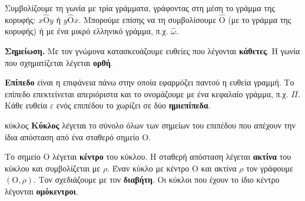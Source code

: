 \begin{center}
\end{center}

Συμβολίζουμε τη γωνία με τρία γράμματα, γράφοντας στη μέση το γράμμα της κορυφής: $x\hat{\mathrm{Ο}}y$ ή $y\hat{\mathrm{Ο}}x$. Μπορούμε επίσης να τη συμβολίσουμε $\hat{\mathrm{Ο}}$ (με το γράμμα της κορυφής) ή με ένα μικρό ελληνικό γράμμα, π.χ. $\hat{\omega}$.

\textbf{Σημείωση.} Με τον γνώμονα κατασκευάζουμε ευθείες που λέγονται \textbf{κάθετες}. Η γωνία που σχηματίζεται λέγεται \textbf{ορθή}.


\textbf{Επίπεδο} είναι η επιφάνεια πάνω στην οποία εφαρμόζει παντού η ευθεία γραμμή. Το επίπεδο επεκτείνεται απεριόριστα και το ονομάζουμε με ένα κεφαλαίο γράμμα, π.χ. $\Pi$. Κάθε ευθεία $\varepsilon$ ενός επιπέδου το χωρίζει σε δύο \textbf{ημιεπίπεδα}.

\begin{center}
\end{center}


\begin{orismos}{κύκλος}
\textbf{Κύκλος} λέγεται το σύνολο όλων των σημείων του επιπέδου που απέχουν την ίδια απόσταση από ένα σταθερό σημείο $\mathrm{Ο}$.
\end{orismos}

Το σημείο $\mathrm{Ο}$ λέγεται \textbf{κέντρο} του κύκλου. Η σταθερή απόσταση λέγεται \textbf{ακτίνα} του κύκλου και συμβολίζεται με $\rho$. Έναν κύκλο με κέντρο $\mathrm{Ο}$ και ακτίνα $\rho$ τον γράφουμε $(\mathrm{Ο},\rho)$. Τον σχεδιάζουμε με τον \textbf{διαβήτη}. Οι κύκλοι που έχουν το ίδιο κέντρο λέγονται \textbf{ομόκεντροι}.

